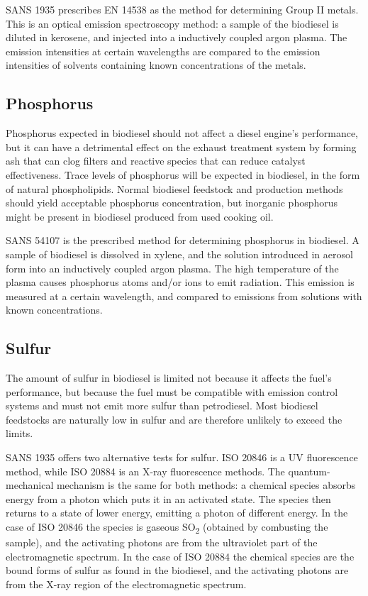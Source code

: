 SANS 1935 prescribes EN 14538 as the method for determining Group II metals.
This is an optical emission spectroscopy method: a sample of the biodiesel is
diluted in kerosene, and injected into a inductively coupled argon plasma. The
emission intensities at certain wavelengths are compared to the emission
intensities of solvents containing known concentrations of the metals.

\subsection{Phosphorus}

Phosphorus expected in biodiesel should not affect a diesel engine's
performance, but it can have a detrimental effect on the exhaust treatment
system by forming ash that can clog filters and reactive species that can reduce
catalyst effectiveness. Trace levels of phosphorus will be expected in
biodiesel, in the form of natural phospholipids. Normal biodiesel feedstock and
production methods should yield acceptable phosphorus concentration, but
inorganic phosphorus might be present in biodiesel produced from used cooking
oil.
 
SANS 54107 is the prescribed method for determining phosphorus in biodiesel. A
sample of biodiesel is dissolved in xylene, and the solution introduced in
aerosol form into an inductively coupled argon plasma. The high temperature of
the plasma causes phosphorus atoms and/or ions to emit radiation. This emission
is measured at a certain wavelength, and compared to emissions from solutions
with known concentrations.

\subsection{Sulfur}

The amount of sulfur in biodiesel is limited not because it affects the fuel's
performance, but because the fuel must be compatible with emission control
systems and must not emit more sulfur than petrodiesel. Most biodiesel
feedstocks are naturally low in sulfur and are therefore unlikely to exceed the
limits.

SANS 1935 offers two alternative tests for sulfur. ISO 20846 is a UV
fluorescence method, while ISO 20884 is an X-ray fluorescence methods. The
quantum-mechanical mechanism is the same for both methods: a chemical species
absorbs energy from a photon which puts it in an activated state. The species
then returns to a state of lower energy, emitting a photon of different energy.
In the case of ISO 20846 the species is gaseous SO\textsubscript{2} (obtained by
combusting the sample), and the activating photons are from the ultraviolet part
of the electromagnetic spectrum. In the case of ISO 20884 the chemical species
are the bound forms of sulfur as found in the biodiesel, and the activating
photons are from the X-ray region of the electromagnetic spectrum.

